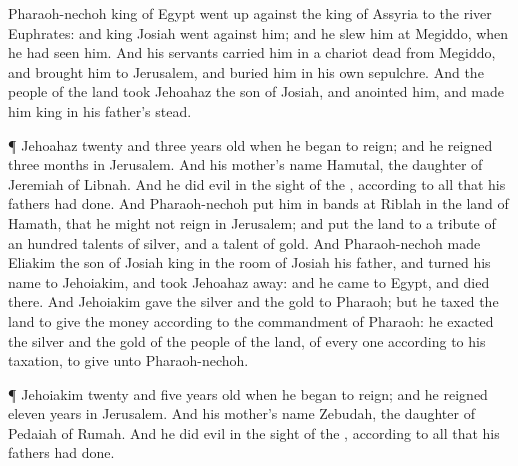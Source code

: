{Pharaoh-nechoh
king of
Egypt went
up against the
king of
Assyria to the
river
Euphrates: and
king
Josiah
went
against him; and he
slew him at
Megiddo, when he had
seen him.
And his
servants carried him in a
chariot
dead from
Megiddo, and
brought him to
Jerusalem, and
buried him in his own
sepulchre. And the
people of the
land
took
Jehoahaz the
son of
Josiah, and
anointed him, and made him
king in his
father’s stead.
\par }{\PP {}¶
Jehoahaz
{}
twenty and
three
years
old when he began to
reign; and he
reigned
three
months in
Jerusalem. And his
mother’s
name
{}
Hamutal, the
daughter of
Jeremiah of
Libnah.
And he
did
{}
evil in the
sight of the
{}, according to all that his
fathers had
done.
And
Pharaoh-nechoh put him in
bands at
Riblah in the
land of
Hamath, that he might not
reign in
Jerusalem; and
put the
land to a
tribute of an
hundred
talents of
silver, and a
talent of
gold.
And
Pharaoh-nechoh made
Eliakim the
son of
Josiah
king in the room of
Josiah his
father, and
turned his
name to
Jehoiakim, and
took
Jehoahaz
away: and he
came to
Egypt, and
died there.
And
Jehoiakim
gave the
silver and the
gold to
Pharaoh; but he
taxed the
land to
give the
money according to the
commandment of
Pharaoh: he
exacted the
silver and the
gold of the
people of the
land, of every
one according to his
taxation, to
give
{} unto
Pharaoh-nechoh.
\par }{\PP {}¶
Jehoiakim
{}
twenty and
five
years
old when he began to
reign; and he
reigned
eleven
years in
Jerusalem. And his
mother’s
name
{}
Zebudah, the
daughter of
Pedaiah of
Rumah.
And he
did
{}
evil in the
sight of the
{}, according to all that his
fathers had
done.

}
